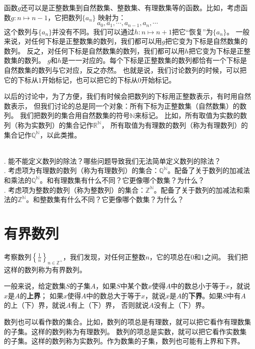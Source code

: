 \documentclass[12pt,UTF8,fontset=none]{ctexbook}
\begin{document}
函数$g$还可以是正整数集到自然数集、整数集、有理数集等的函数。比如，考虑函数$g:n\mapsto n-1$，它把数列$\{a_n\}$
映射为：
$$ a_0, a_1, \cdots, a_{n-1}, a_n,\cdots$$
这个数列与$\{a_n\}$并没有不同。我们可以通过$h:n\mapsto n+1$把它“恢复”为$\{a_n\}$。
一般来说，对任何下标是正整数集的数列，我们都可以用$g$把它变为下标是自然数集的数列。
反之，对任何下标是自然数集的数列，我们都可以用$h$把它变为下标是正整数集的数列。
$g$和$h$是一一对应的。每个下标是正整数集的数列都恰有一个下标是自然数集的数列与它对应，反之亦然。
也就是说，我们讨论数列的时候，可以把它的下标从$1$开始标记，也可以把它的下标从$0$开始标记。

以后的讨论中，为了方便，我们有时候会把数列的下标用正整数表示，有时用自然数表示，
但我们讨论的总是同一个对象：所有下标为正整数集（自然数集）的数列。
我们把数列的集合用自然数集的符号$\mathbb{N}$来标记。
比如，所有取值为实数的数列（称为实数列）的集合记作$\mathbb{R}^\mathbb{N}$，
所有取值为有理数的数列（称为有理数列）的集合记作$\mathbb{Q}^\mathbb{N}$，以此类推。

\begin{sk}
    \mbox{} \\
    . 能不能定义数列的除法？哪些问题导致我们无法简单定义数列的除法？\\
    . 考虑项为有理数的数列（称为有理数列）的集合：$\mathbb{Q}^{\mathbb{N}}$。配备了关于数列的加减法和乘法的$\mathbb{Q}^{\mathbb{N}}$。和有理数集有什么不同？它更像哪个数集？为什么？\\
    . 考虑项为整数的数列（称为整数列）的集合：$\mathbb{Z}^{\mathbb{N}}$。配备了关于数列的加减法和乘法的$\mathbb{Z}^{\mathbb{N}}$。和整数集有什么不同？它更像哪个数集？为什么？
\end{sk}

\section{有界数列}
考察数列$\left\{\frac{1}{n}\right\}_{n\in\mathbb{Z}^+}$，我们发现，对任何正整数$n$，它的项总在$0$和$1$之间。
我们把这样的数列称为有界数列。

一般来说，给定数集$S$的子集$A$，如果$S$中某个数$x$使得$A$中的数总小于等于$x$，就说$x$是$A$的\textbf{上界}；
如果$x$使得$A$中的数总大于等于$x$，就说$x$是$A$的\textbf{下界}。如果$S$中有$A$的上（下）界，就说$A$有上（下）界，
否则就说$A$没有上（下）界。

数列也可以看作数的集合。比如，数列的项总是有理数，就可以把它看作有理数集的子集。这样的数列称为有理数列。
数列的项总是实数，就可以把它看作实数集的子集。这样的数列称为实数列。作为数集的子集，数列也可能有上界和下界。
\end{document}
